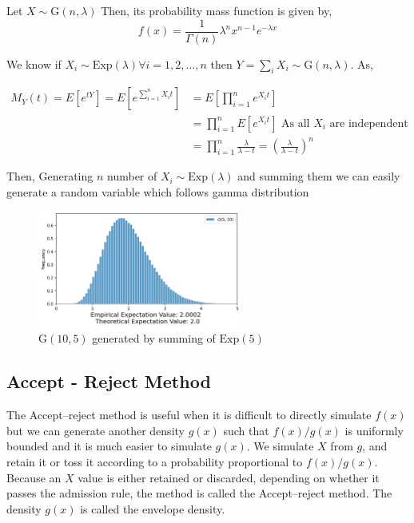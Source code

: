 \begin{example}
    Let $X\sim \text{G}(n,\lambda)$ Then, its probability  mass function is given by,
	\[
		f(x) = \frac{1}{\Gamma(n)}\lambda^{n}x^{n-1}e^{-\lambda x}
	\]

    We know if $X_i\sim \text{Exp}(\lambda) \forall i = 1,2, \ldots ,n$ then  $Y=\sum_i X_i \sim \text{G}(n,\lambda)$. As,

	\begin{align*}
		M_{Y}(t) = E \left[ e^{tY} \right] = E\left[ e^{\sum_{i=1}^{n} X_it  }\right] & = E\left[ \prod_{i=1}^{n} e^{X_it} \right]                                                \\
		                                                                              & =\prod_{i=1}^{n} E\left[  e^{X_it} \right] \text{ As all $X_i$ are independent }          \\
		                                                                              & = \prod_{i=1}^{n}\frac{\lambda}{\lambda-t} = \left( \frac{\lambda}{\lambda-t} \right)^{n}
	\end{align*}

    Then, Generating  $n$ number of $X_i\sim \text{Exp}(\lambda)$
	and summing them we can easily generate a random variable which follows gamma distribution
	\begin{figure}[H]

		\centering
		\includegraphics[width=0.6\textwidth]{images/gamma_ITA.png}
        \caption{$\text{G}(10,5)$ generated by summing of $\text{Exp}(5)$}
	\end{figure}
\end{example}

\subsection{Accept - Reject Method}
The Accept–reject method is useful when it is difficult to directly simulate $f(x)$ but we can generate another density $g(x)$ such that $f(x)/g(x)$
is uniformly bounded and it is much easier to simulate $g(x)$. We simulate  $X$ from  $g$, and retain it or toss it according
to a probability proportional to $f(x)/g(x)$.
Because an $X$ value is either retained
or discarded, depending on whether it passes the admission rule, the method is called
the Accept–reject method. The density $g(x)$ is called the envelope density.

